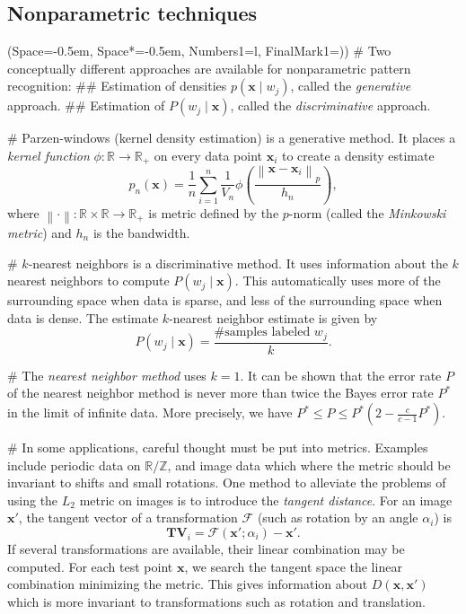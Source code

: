 \documentclass[12pt, a4paper]{article}
\newcommand{\listSpace}{-0.5em}%
\newcommand{\R}{\mathbb{R}}
\newcommand{\F}{\mathcal{F}}
\newcommand{\Z}{\mathbb{Z}}
\newcommand{\vect}[1]{\bm{#1}}
\newcommand{\norm}[1]{\left\lVert#1\right\rVert}
\begin{document}
\subsection{Nonparametric techniques}
\begin{easylist}[itemize]
\ListProperties(Space=\listSpace, Space*=\listSpace, Numbers1=l, FinalMark1={)})
# Two conceptually different approaches are available for nonparametric pattern recognition: 
## Estimation of densities $p(\vect{x} \mid w_j)$, called the \emph{generative} approach.
## Estimation of $P(w_j \mid \vect{x})$, called the \emph{discriminative} approach.

# Parzen-windows (kernel density estimation) is a generative method. 
It places a \emph{kernel function} $\phi: \R \to \R_+$ on every data point $\vect{x}_i$ to create a density estimate
\begin{equation*}
	p_n(\vect{x}) = \frac{1}{n} \sum_{i=1}^{n} \frac{1}{V_n} 
	\phi \left( \frac{\norm{\vect{x} - \vect{x}_i}_p}{h_n}  \right),
\end{equation*}
where $\norm{\cdot}: \R \times \R \to \R_+$ is metric defined by the $p$-norm (called the \emph{Minkowski metric}) and $h_n$ is the bandwidth.

# $k$-nearest neighbors is a discriminative method.
It uses information about the $k$ nearest neighbors to compute $P(w_j \mid \vect{x})$.
This automatically uses more of the surrounding space when data is sparse, and less of the surrounding space when data is dense.
The estimate $k$-nearest neighbor estimate is given by
\begin{equation*}
	P(w_j \mid \vect{x}) = \frac{\text{\# samples labeled } w_j}{k}.
\end{equation*}

# The \emph{nearest neighbor method} uses $k= 1$.
It can be shown that the error rate $P$ of the nearest neighbor method is never more than twice the Bayes error rate $P^*$ in the limit of infinite data.
More precisely, we have $P^* \leq P \leq P^* (2 - \frac{c}{c-1} P^*)$.

# In some applications, careful thought must be put into metrics.
Examples include periodic data on $\R / \Z$, and image data which where the metric should be invariant to shifts and small rotations.
One method to alleviate the problems of using the $L_2$ metric on images is to introduce the \emph{tangent distance}.
For an image $\vect{x}'$, the tangent vector of a transformation $\F$ (such as rotation by an angle $\alpha_i$) is
\begin{equation*}
	\vect{TV}_i = \F\left(\vect{x}'; \alpha_i \right) - \vect{x}'.
\end{equation*}
If several transformations are available, their linear combination may be computed.
For each test point $\vect{x}$, we search the tangent space the linear  combination minimizing the metric.
This gives information about $D(\vect{x}, \vect{x}')$ which is more invariant to transformations such as rotation and translation.


\end{easylist}
\end{document}
